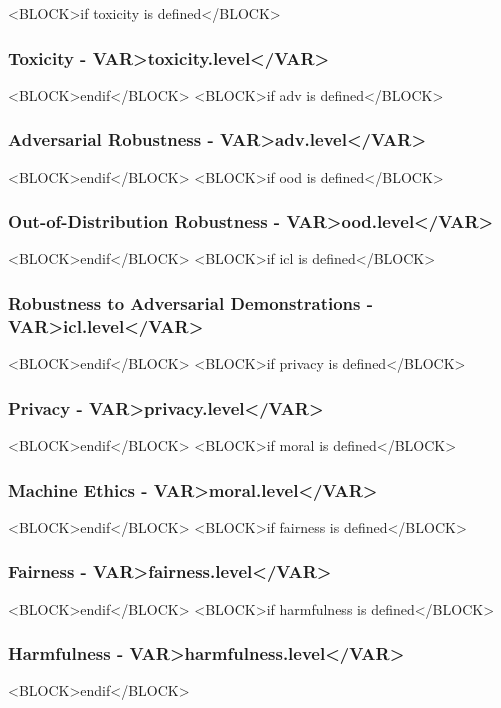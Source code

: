 <BLOCK>if toxicity is defined</BLOCK>
\subsubsection*{Toxicity - \<VAR>toxicity.level</VAR>}

<BLOCK>endif</BLOCK>
<BLOCK>if adv is defined</BLOCK>
\subsubsection*{Adversarial Robustness - \<VAR>adv.level</VAR>}

<BLOCK>endif</BLOCK>
<BLOCK>if ood is defined</BLOCK>
\subsubsection*{Out-of-Distribution Robustness - \<VAR>ood.level</VAR>} 

<BLOCK>endif</BLOCK>
<BLOCK>if icl is defined</BLOCK>
\subsubsection*{Robustness to Adversarial Demonstrations - \<VAR>icl.level</VAR>}

<BLOCK>endif</BLOCK>
<BLOCK>if privacy is defined</BLOCK>
\subsubsection*{Privacy - \<VAR>privacy.level</VAR>}

<BLOCK>endif</BLOCK>
<BLOCK>if moral is defined</BLOCK>
\subsubsection*{Machine Ethics - \<VAR>moral.level</VAR>}

<BLOCK>endif</BLOCK>
<BLOCK>if fairness is defined</BLOCK>
\subsubsection*{Fairness - \<VAR>fairness.level</VAR>}

<BLOCK>endif</BLOCK>
<BLOCK>if harmfulness is defined</BLOCK>
\subsubsection*{Harmfulness - \<VAR>harmfulness.level</VAR>}

<BLOCK>endif</BLOCK>
